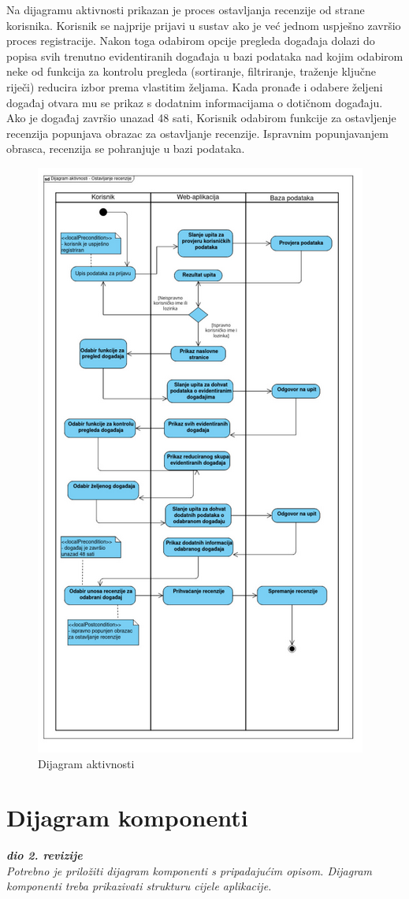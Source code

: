 			 Na dijagramu aktivnosti prikazan je proces ostavljanja recenzije od strane korisnika. Korisnik se najprije prijavi u sustav ako je već jednom uspješno završio proces registracije. Nakon toga odabirom opcije pregleda događaja dolazi do popisa svih trenutno evidentiranih događaja u bazi podataka nad kojim odabirom neke od funkcija za kontrolu pregleda (sortiranje, filtriranje, traženje ključne riječi) reducira izbor prema vlastitim željama. Kada pronađe i odabere željeni događaj otvara mu se prikaz s dodatnim informacijama o dotičnom događaju. Ako je događaj završio unazad 48 sati, Korisnik odabirom funkcije za ostavljenje recenzija popunjava obrazac za ostavljanje recenzije. Ispravnim popunjavanjem obrasca, recenzija se pohranjuje u bazi podataka.  
			 \begin{figure}[htbp]
				\centering
				\includegraphics[height=0.7\textheight]{dijagrami/dijagram_aktivnosti_v2.png}
				\caption{Dijagram aktivnosti}
			\label{fig:my_image}
			\end{figure}

			\eject
		\section{Dijagram komponenti}
		
			\textbf{\textit{dio 2. revizije}}\\
		
			 \textit{Potrebno je priložiti dijagram komponenti s pripadajućim opisom. Dijagram komponenti treba prikazivati strukturu cijele aplikacije.}